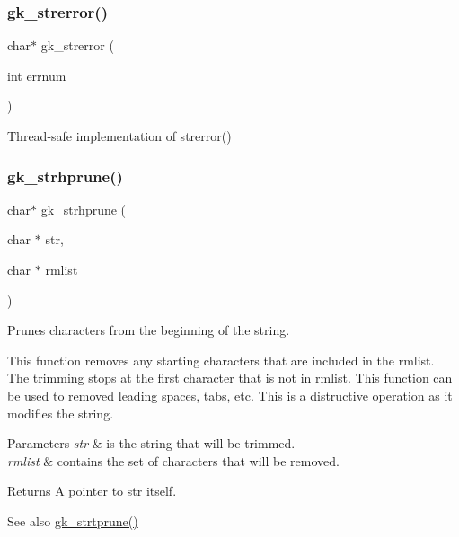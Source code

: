 \subsubsection{\texorpdfstring{gk\+\_\+strerror()}{gk\_strerror()}}
{\footnotesize\ttfamily char$\ast$ gk\+\_\+strerror (\begin{DoxyParamCaption}\item[{int}]{errnum }\end{DoxyParamCaption})}



Thread-\/safe implementation of strerror() 

\mbox{\label{a00077_aa622155b6fc206a3ae4142b7cfe39763}} 
\subsubsection{\texorpdfstring{gk\+\_\+strhprune()}{gk\_strhprune()}}
{\footnotesize\ttfamily char$\ast$ gk\+\_\+strhprune (\begin{DoxyParamCaption}\item[{char $\ast$}]{str,  }\item[{char $\ast$}]{rmlist }\end{DoxyParamCaption})}



Prunes characters from the beginning of the string. 

This function removes any starting characters that are included in the {\ttfamily rmlist}. The trimming stops at the first character that is not in {\ttfamily rmlist}. This function can be used to removed leading spaces, tabs, etc. This is a distructive operation as it modifies the string.


\begin{DoxyParams}{Parameters}
{\em str} & is the string that will be trimmed. \\
\hline
{\em rmlist} & contains the set of characters that will be removed. \\
\hline
\end{DoxyParams}
\begin{DoxyReturn}{Returns}
A pointer to {\ttfamily str} itself. 
\end{DoxyReturn}
\begin{DoxySeeAlso}{See also}
\hyperlink{a00143_a05261ee12d082a78cabc018d2f5e2266}{gk\+\_\+strtprune()} 
\end{DoxySeeAlso}
\mbox{\label{a00077_a50149c8c9f8dd36fcad46773f35eedc4}} 

